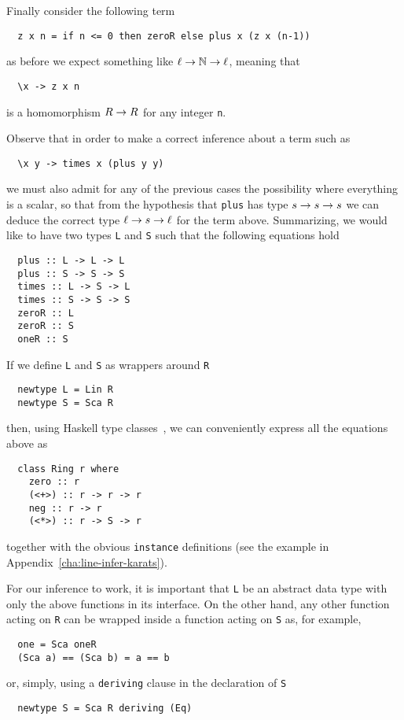 Finally consider the following term
\begin{lstlisting}
  z x n = if n <= 0 then zeroR else plus x (z x (n-1))
\end{lstlisting}
as before we expect something like $\ell\rightarrow\mathbb{N}\rightarrow\ell$, meaning that
\begin{lstlisting}
  \x -> z x n
\end{lstlisting}
is a homomorphism $R\rightarrow R$ for any integer \lstinline{n}.

Observe that in order to make a correct inference about a term such as
\begin{lstlisting}
  \x y -> times x (plus y y)
\end{lstlisting}
we must also admit for any of the previous cases the possibility where
everything is a scalar, so that from the hypothesis that
\lstinline{plus} has type $s\rightarrow s\rightarrow s$ we can deduce the correct type
$\ell\rightarrow s\rightarrow\ell$ for the term above. Summarizing, we would like to
have two types \lstinline{L} and \lstinline{S} such that the following
equations hold
\begin{lstlisting}
  plus :: L -> L -> L
  plus :: S -> S -> S
  times :: L -> S -> L
  times :: S -> S -> S
  zeroR :: L
  zeroR :: S
  oneR :: S
\end{lstlisting}

If we define \lstinline{L} and \lstinline{S} as wrappers around
\lstinline{R}
\begin{lstlisting}
  newtype L = Lin R
  newtype S = Sca R
\end{lstlisting}
then, using Haskell type
classes~\cite{Walder+Blott-ad-hoc-polymorphism}, we can conveniently
express all the equations above as
\begin{lstlisting}
  class Ring r where
    zero :: r
    (<+>) :: r -> r -> r
    neg :: r -> r
    (<*>) :: r -> S -> r
\end{lstlisting}
together with the obvious \lstinline{instance} definitions (see the
example in Appendix~\ref{cha:line-infer-karats}). 

  For our
inference to work, it is important that \lstinline{L} be an abstract
data type with only the above functions in its interface. On the other
hand, any other function acting on \lstinline{R} can be wrapped inside
a function acting on \lstinline{S} as, for example,
\begin{lstlisting}
  one = Sca oneR
  (Sca a) == (Sca b) = a == b
\end{lstlisting}
or, simply, using a \lstinline{deriving} clause in the declaration of
\lstinline{S}
\begin{lstlisting}
  newtype S = Sca R deriving (Eq)
\end{lstlisting}

